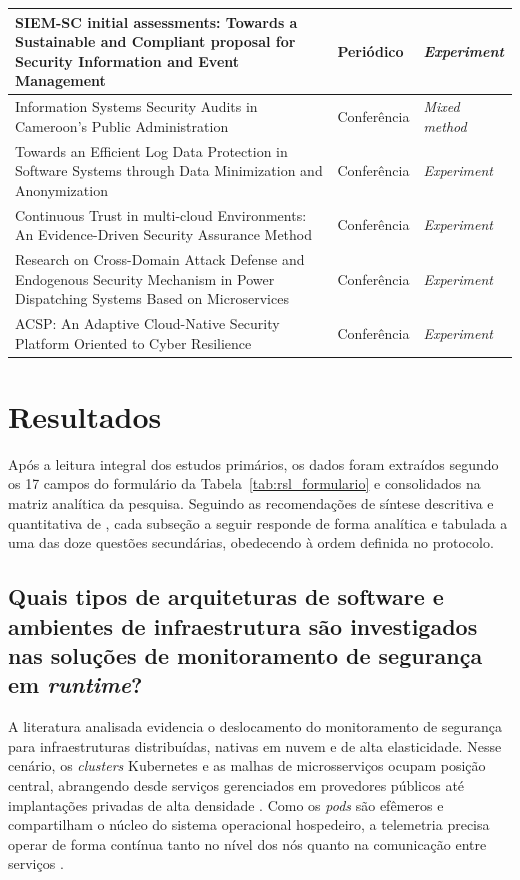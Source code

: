 {\begin{longtable}{p{8.4cm}p{2.2cm}p{3.4cm}}
SIEM-SC initial assessments: Towards a Sustainable and Compliant proposal for Security Information and Event Management~\cite{velasquez2025} & Periódico & \textit{Experiment} \\ \hline
Information Systems Security Audits in Cameroon's Public Administration~\cite{enaw2018} & Conferência & \textit{Mixed method} \\ \hline
Towards an Efficient Log Data Protection in Software Systems through Data Minimization and Anonymization~\cite{portillo2019} & Conferência & \textit{Experiment} \\ \hline
Continuous Trust in multi-cloud Environments: An Evidence-Driven Security Assurance Method~\cite{shao2026b} & Conferência & \textit{Experiment} \\ \hline
Research on Cross-Domain Attack Defense and Endogenous Security Mechanism in Power Dispatching Systems Based on Microservices~\cite{xu2025} & Conferência & \textit{Experiment} \\ \hline
ACSP: An Adaptive Cloud-Native Security Platform Oriented to Cyber Resilience~\cite{hao2025} & Conferência & \textit{Experiment} \\ \hline
\end{longtable}}
\FloatBarrier

\section{Resultados}
\label{sec:rsl_resultados}

Após a leitura integral dos estudos primários, os dados foram extraídos segundo os 17 campos do formulário da Tabela~\ref{tab:rsl_formulario} e consolidados na matriz analítica da pesquisa. Seguindo as recomendações de síntese descritiva e quantitativa de , cada subseção a seguir responde de forma analítica e tabulada a uma das doze questões secundárias, obedecendo à ordem definida no protocolo.

\subsection{Quais tipos de arquiteturas de software e ambientes de infraestrutura são investigados nas soluções de monitoramento de segurança em \textit{runtime}?}
\label{subsec:rsl_qs01}

A literatura analisada evidencia o deslocamento do monitoramento de segurança para infraestruturas distribuídas, nativas em nuvem e de alta elasticidade. Nesse cenário, os \textit{clusters} Kubernetes e as malhas de microsserviços ocupam posição central, abrangendo desde serviços gerenciados em provedores públicos até implantações privadas de alta densidade \cite{joshisegireddy2026,aftab2026,shao2026a,shao2026b,devarajulu2025}. Como os \textit{pods} são efêmeros e compartilham o núcleo do sistema operacional hospedeiro, a telemetria precisa operar de forma contínua tanto no nível dos nós quanto na comunicação entre serviços \cite{darwesh2024,hao2025}.

